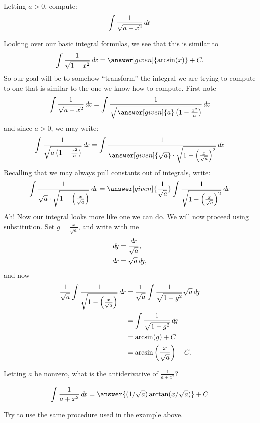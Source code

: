 \documentclass{ximera}
\begin{document}
\begin{example}
  Letting $a>0$, compute:
  \[
  \int \frac{1}{\sqrt{a-x^2}} \mathop{}\!d\! x
  \]
  \begin{explanation}
    Looking over our basic integral formulas, we see that this is similar to
    \[
    \int \frac{1}{\sqrt{1-x^2}}\d x= \answer[given]{\arcsin(x)}+C.
    \]
    So our goal will be to somehow ``transform'' the integral we are
    trying to compute to one that is similar to the one we know how to
    compute. First note
    \[
    \int \frac{1}{\sqrt{a-x^2}} \d x  =
    \int \frac{1}{\sqrt{\answer[given]{a}\left(1-\frac{x^2}{a}\right)}} \d x
    \]
    and since $a>0$, we may write:
    \[
    \int \frac{1}{\sqrt{a\left(1-\frac{x^2}{a}\right)}} \d x=
    \int \frac{1}{\answer[given]{\sqrt{a}}\cdot \sqrt{1-\left(\frac{x}{\sqrt{a}}\right)^2}} \d x
    \]
    Recalling that we may always pull constants out of integrals, write:
    \[
    \int \frac{1}{\sqrt{a}\cdot \sqrt{1-\left(\frac{x}{\sqrt{a}}\right)}} \d x = 
    \answer[given]{\frac{1}{\sqrt{a}}}\int \frac{1}{\sqrt{1-\left(\frac{x}{\sqrt{a}}\right)^2}} \d x 
    \]
    Ah! Now our integral looks more like one we can do. We will now
    proceed using substitution. Set $g = \frac{x}{\sqrt{a}}$, and write with me
    \begin{align*}
      \d g &= \frac{\d x}{\sqrt{a}},\\
      \d x &= \sqrt{a}\d g,
    \end{align*}
    and now
    \begin{align*}
    \frac{1}{\sqrt{a}}\int \frac{1}{\sqrt{1-\left(\frac{x}{\sqrt{a}}\right)}} \mathop{}\!d\! x &=
    \frac{1}{\sqrt{a}}\int \frac{1}{\sqrt{1-g^2}} \sqrt{a} \mathop{}\!d\! g\\
    &=\int \frac{1}{\sqrt{1-g^2}}\mathop{}\!d\! g\\
    &=\arcsin(g) + C\\
    &=\arcsin\left(\frac{x}{\sqrt{a}}\right) + C.
    \end{align*}
  \end{explanation}
\end{example}





\begin{question}
  Letting $a$ be nonzero, what is the antiderivative of $\frac{1}{a +
    x^2}$?
  \begin{prompt}%
    \[
    \int \frac{1}{a + x^2} \d x = \answer{(1/\sqrt{a}) \arctan(x/\sqrt{a})}+C
    \]
  \end{prompt}
  \begin{hint}
    Try to use the same procedure used in the example above.
  \end{hint}
\end{question}
\end{document}
